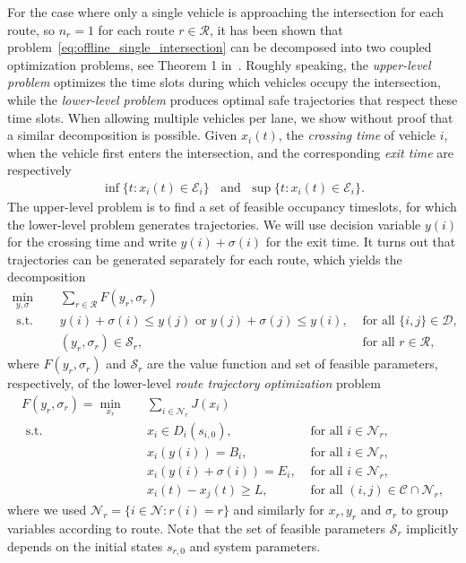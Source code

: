 \documentclass[a4paper]{article}
\theoremstyle{definition}
\theoremstyle{plain}
\begin{document}
For the case where only a single vehicle is approaching the intersection for
each route, so $n_{r} = 1$ for each route $r \in \mathcal{R}$, it has been shown
that problem~\eqref{eq:offline_single_intersection} can be decomposed into two coupled optimization problems, see
Theorem 1 in~\cite{hultApproximateSolutionOptimal2015}. Roughly speaking, the \textit{upper-level problem} optimizes the time
slots during which vehicles occupy the intersection, while the \textit{lower-level problem}
produces optimal safe trajectories that respect these time slots.
%
When allowing multiple vehicles per lane, we show without proof that a similar
decomposition is possible.
%
Given $x_{i}(t)$, the \textit{crossing time} of vehicle $i$, when the vehicle
first enters the intersection, and the corresponding \textit{exit time} are respectively
\begin{align*}
  \inf \{ t: x_{i}(t) \in \mathcal{E}_{i} \}  \;\; \text{ and } \; \sup \{ t: x_{i}(t) \in \mathcal{E}_{i} \} .
\end{align*}
%
The upper-level problem is to find a set of feasible occupancy timeslots, for
which the lower-level problem generates trajectories. We will use decision
variable $y(i)$ for the crossing time and write $y(i) + \sigma(i)$ for the exit
time. It turns out that trajectories can be generated separately for each route,
which yields the decomposition
%
\begin{align*}
  \min_{y, \sigma} \quad & \sum_{r \in \mathcal{R}} F(y_{r}, \sigma_{r}) \\
  \text{ s.t. } \quad & y(i) + \sigma(i) \leq y(j) \text{ or } y(j) + \sigma(j) \leq y(i), & \text{ for all } \{i, j\} \in \mathcal{D} , \\
  & (y_{r}, \sigma_{r}) \in \mathcal{S}_{r} , & \text{ for all } r \in \mathcal{R} ,
\end{align*}
where $F(y_{r}, \sigma_{r})$ and $\mathcal{S}_{r}$ are the value function and
set of feasible parameters, respectively, of the lower-level \textit{route trajectory optimization}
problem
\begin{align*}
  F(y_{r}, \sigma_{r}) = \min_{x_{r}} \quad & \sum_{i \in \mathcal{N}_{r}} J(x_{i}) \\
  \text{ s.t. } \quad & x_{i} \in D_{i}(s_{i,0}) , & \text{ for all } i \in \mathcal{N}_{r} , \\
  & x_{i}(y(i)) = B_{i} , & \text{ for all } i \in \mathcal{N}_{r} , \\
  & x_{i}(y(i) + \sigma(i)) = E_{i} , & \text{ for all } i \in \mathcal{N}_{r} , \\
  & x_{i}(t) - x_{j}(t) \geq L , & \text{ for all } (i, j) \in \mathcal{C} \cap \mathcal{N}_{r} ,
\end{align*}
where we used $\mathcal{N}_{r} = \{ i \in \mathcal{N} : r(i) = r \}$ and
similarly for $x_{r}, y_{r}$ and $\sigma_{r}$ to group variables according to
route. Note that the set of feasible parameters $\mathcal{S}_{r}$ implicitly
depends on the initial states $s_{r,0}$ and system parameters.
\end{document}
